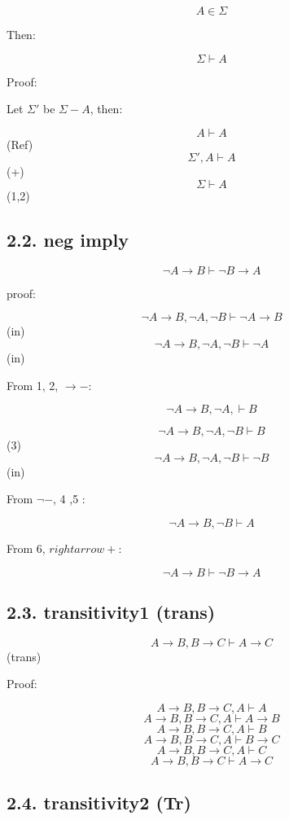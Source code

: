 \documentclass{article} %
\begin{document}
\[A \in \Sigma\]

Then:

\[\Sigma\vdash A\]

Proof:

Let \(\Sigma'\) be \(\Sigma - A\), then:

\[A\vdash A\](Ref) \[\Sigma', A\vdash A\](+) \[\Sigma \vdash A\] (1,2)

\hypertarget{neg-imply}{%
\subsection{2.2. neg imply}\label{neg-imply}}

\[\neg A \rightarrow B \vdash \neg B \rightarrow A\]

proof:

\[\neg A \rightarrow B , \neg A, \neg B\vdash \neg A \rightarrow B \](in)
\[\neg A \rightarrow B , \neg A, \neg B\vdash \neg A\](in)

From 1, 2, \(\rightarrow -\):

\[\neg A \rightarrow B , \neg A, \vdash B\]

\[\neg A \rightarrow B , \neg A, \neg B\vdash B\](3)
\[\neg A \rightarrow B , \neg A, \neg B\vdash \neg B\](in)

From \(\neg -\), 4 ,5 :

\[\neg A \rightarrow B , \neg B\vdash A\]

From 6, \(rightarrow +\):

\[\neg A \rightarrow B \vdash \neg B \rightarrow A\]

\hypertarget{transitivity1-trans}{%
\subsection{2.3. transitivity1 (trans)}\label{transitivity1-trans}}

\[A\rightarrow B, B\rightarrow C \vdash A\rightarrow C\] (trans)

Proof:

\[A\rightarrow B, B\rightarrow C , A \vdash A\]
\[A\rightarrow B, B\rightarrow C , A \vdash A\rightarrow B\]
\[A\rightarrow B, B\rightarrow C , A \vdash B\]
\[A\rightarrow B, B\rightarrow C , A \vdash B\rightarrow C\]
\[A\rightarrow B, B\rightarrow C , A \vdash C\]
\[A\rightarrow B, B\rightarrow C \vdash A \rightarrow C\]

\hypertarget{transitivity2-tr}{%
\subsection{2.4. transitivity2 (Tr)}\label{transitivity2-tr}}
\end{document}
